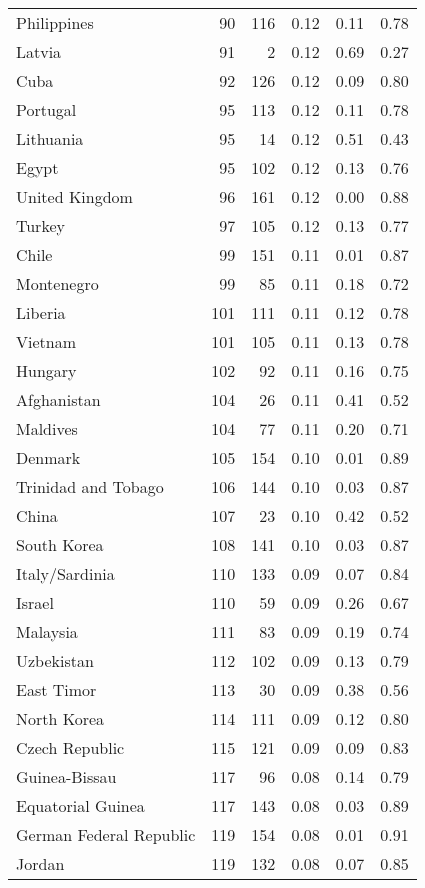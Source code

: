 \begin{longtable}[t]{lrrrrr}
Philippines & 90 & 116 & 0.12 & 0.11 & 0.78\\
\addlinespace
Latvia & 91 & 2 & 0.12 & 0.69 & 0.27\\
Cuba & 92 & 126 & 0.12 & 0.09 & 0.80\\
Portugal & 95 & 113 & 0.12 & 0.11 & 0.78\\
Lithuania & 95 & 14 & 0.12 & 0.51 & 0.43\\
Egypt & 95 & 102 & 0.12 & 0.13 & 0.76\\
\addlinespace
United Kingdom & 96 & 161 & 0.12 & 0.00 & 0.88\\
Turkey & 97 & 105 & 0.12 & 0.13 & 0.77\\
Chile & 99 & 151 & 0.11 & 0.01 & 0.87\\
Montenegro & 99 & 85 & 0.11 & 0.18 & 0.72\\
Liberia & 101 & 111 & 0.11 & 0.12 & 0.78\\
\addlinespace
Vietnam & 101 & 105 & 0.11 & 0.13 & 0.78\\
Hungary & 102 & 92 & 0.11 & 0.16 & 0.75\\
Afghanistan & 104 & 26 & 0.11 & 0.41 & 0.52\\
Maldives & 104 & 77 & 0.11 & 0.20 & 0.71\\
Denmark & 105 & 154 & 0.10 & 0.01 & 0.89\\
\addlinespace
Trinidad and Tobago & 106 & 144 & 0.10 & 0.03 & 0.87\\
China & 107 & 23 & 0.10 & 0.42 & 0.52\\
South Korea & 108 & 141 & 0.10 & 0.03 & 0.87\\
Italy/Sardinia & 110 & 133 & 0.09 & 0.07 & 0.84\\
Israel & 110 & 59 & 0.09 & 0.26 & 0.67\\
\addlinespace
Malaysia & 111 & 83 & 0.09 & 0.19 & 0.74\\
Uzbekistan & 112 & 102 & 0.09 & 0.13 & 0.79\\
East Timor & 113 & 30 & 0.09 & 0.38 & 0.56\\
North Korea & 114 & 111 & 0.09 & 0.12 & 0.80\\
Czech Republic & 115 & 121 & 0.09 & 0.09 & 0.83\\
\addlinespace
Guinea-Bissau & 117 & 96 & 0.08 & 0.14 & 0.79\\
Equatorial Guinea & 117 & 143 & 0.08 & 0.03 & 0.89\\
German Federal Republic & 119 & 154 & 0.08 & 0.01 & 0.91\\
Jordan & 119 & 132 & 0.08 & 0.07 & 0.85\\

\end{longtable}

